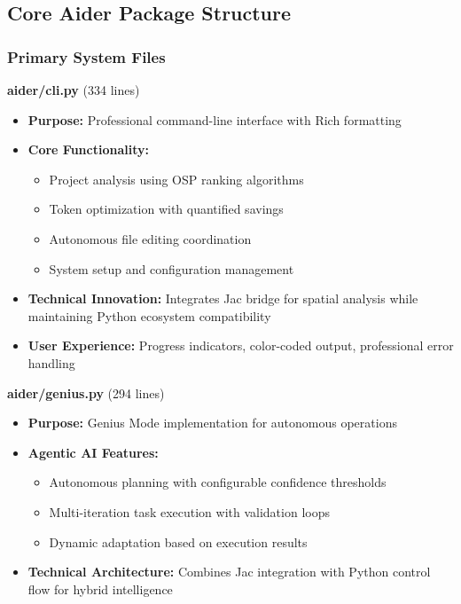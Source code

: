 \documentclass[12pt,a4paper]{article}
\begin{document}
\subsection{Core Aider Package Structure}

\subsubsection{Primary System Files}

\textbf{aider/cli.py} (334 lines)
\begin{itemize}
    \item \textbf{Purpose:} Professional command-line interface with Rich formatting
    \item \textbf{Core Functionality:}
    \begin{itemize}
        \item Project analysis using OSP ranking algorithms
        \item Token optimization with quantified savings
        \item Autonomous file editing coordination
        \item System setup and configuration management
    \end{itemize}
    \item \textbf{Technical Innovation:} Integrates Jac bridge for spatial analysis while maintaining Python ecosystem compatibility
    \item \textbf{User Experience:} Progress indicators, color-coded output, professional error handling
\end{itemize}

\textbf{aider/genius.py} (294 lines)
\begin{itemize}
    \item \textbf{Purpose:} Genius Mode implementation for autonomous operations
    \item \textbf{Agentic AI Features:}
    \begin{itemize}
        \item Autonomous planning with configurable confidence thresholds
        \item Multi-iteration task execution with validation loops
        \item Dynamic adaptation based on execution results
    \end{itemize}
    \item \textbf{Technical Architecture:} Combines Jac integration with Python control flow for hybrid intelligence
\end{itemize}
\end{document}

